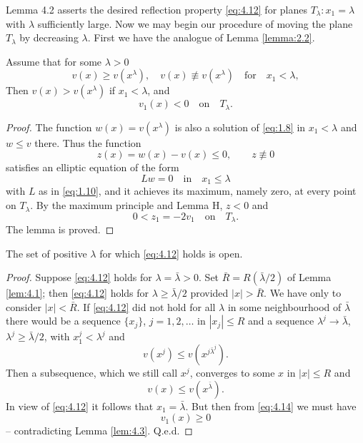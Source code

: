 Lemma 4.2 asserts the desired reflection property \eqref{eq:4.12} for planes 
$T_{\lambda}:x_1 =\lambda$ with $\lambda$ sufficiently large. 
Now we may begin our procedure of moving the plane $T_{\lambda}$ by decreasing $\lambda$.
First we have the analogue of Lemma \ref{lemma:2.2}.
\begin{lemma}\label{lem:4.3}
	Assume that for some $\lambda >0$
	\[ v(x)\geq  v(x^{\lambda}),\quad v(x)\not\equiv v(x^{\lambda})\quad \text{for}\quad x_1<\lambda, \]
	Then $v(x)>v(x^{\lambda})$ if $x_1 <\lambda$, and
	\begin{equation}\label{eq:4.13}
		v_1(x)<0\quad\text{on}\quad T_{\lambda}.
	\end{equation}
\end{lemma}
\begin{proof}
	The function $w(x)= v(x^{\lambda})$ is also a solution of \eqref{eq:1.8} in $x_1 < \lambda$ 
  and $w\leq v$ there. Thus the function
	\[z(x) = w(x)- v(x) \leq 0,\qquad z \not\equiv 0\]
	satisfies an elliptic equation of the form
	\[Lw=0\quad \text{in}\quad x_1\leq \lambda\]
	with $L$ as in \eqref{eq:1.10}, and it achieves its maximum, namely zero, at every point on $T_{\lambda}$. By the maximum principle and Lemma H, $z < 0$ and
	\[0<z_1 = -2v_1\quad\text{on}\quad T_{\lambda}.\]
	The lemma is proved.
\end{proof}
\begin{lemma}\label{lem:4.4}
	The set of positive $\lambda$ for which \eqref{eq:4.12} holds is open.
\end{lemma}
\begin{proof}
	Suppose \eqref{eq:4.12} holds for $\lambda=\bar{\lambda}>0$. 
  Set $\bar{R} =R(\bar{\lambda}/2)$ of Lemma \ref{lem:4.1}; 
  then \eqref{eq:4.12} holds for $\lambda\geq \bar{\lambda}/2$ provided $|x| >\bar{R}$. 
  We have only to consider $|x|<\bar{R}$. 
  If \eqref{eq:4.12} did not hold for all $\lambda$ in some neighbourhood of $\bar{\lambda}$ 
  there would be a sequence $\{x_j\}$, $j = 1, 2,\ldots$ in $|x_j|\leq  R$ 
  and a sequence $\lambda^j\rightarrow\bar{\lambda}$, $\lambda^j\geq \bar{\lambda}/2$, 
  with $x_1^j<\lambda^j$ and
	\begin{equation}\label{eq:4.14}
		v(x^j) \leq  v(x^{j\bar{\lambda}^j}) . 
	\end{equation}
	Then a subsequence, which we still call $x^j$, converges to some $x$ in $|x|\leq  R$ and
	\[v(x) \leq  v(x^{\bar{\lambda}}).\]
	In view of \eqref{eq:4.12} it follows that $x_1 =\bar{\lambda}$. But then from \eqref{eq:4.14} we must have
	\[v_1(x)\geq 0\]
	-- contradicting Lemma \ref{lem:4.3}. Q.e.d.
\end{proof}
